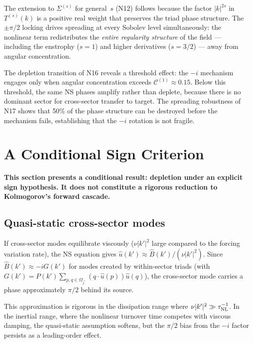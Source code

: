 \documentclass[11pt]{article}
\theoremstyle{definition}
\newcommand{\cC}{\mathcal{C}}
\begin{document}
The extension to $\Sigma^{(s)}$ for general~$s$ (N12)
follows because the factor $|k|^{2s}$ in $T^{(s)}(k)$
is a positive real weight that preserves the triad
phase structure.  The $\pm\pi/2$ locking drives
spreading at every Sobolev level simultaneously: the
nonlinear term redistributes the \emph{entire regularity
structure} of the field --- including the enstrophy
($s=1$) and higher derivatives ($s=3/2$) --- away from
angular concentration.

The depletion transition of N16 reveals a threshold
effect: the $-i$ mechanism engages only when angular
concentration exceeds $\cC^{(1)}\approx 0.15$.  Below
this threshold, the same NS phases amplify rather than
deplete, because there is no dominant sector for
cross-sector transfer to target.  The spreading
robustness of N17 shows that 50\% of the phase
structure can be destroyed before the mechanism fails,
establishing that the $-i$ rotation is not fragile.

\section{A Conditional Sign Criterion}
\label{sec:conditional}

\textbf{This section presents a conditional result:
depletion under an explicit sign hypothesis.  It does
not constitute a rigorous reduction to Kolmogorov's
forward cascade.}

\subsection{Quasi-static cross-sector modes}

If cross-sector modes equilibrate viscously
($\nu|k'|^2$ large compared to the forcing variation
rate), the NS equation gives
$\hat u(k')\approx\hat B(k')/(\nu|k'|^2)$.  Since
$\hat B(k')\approx -iG(k')$ for modes created by
within-sector triads (with
$G(k')=P(k')\sum_{p,q\in\Omega_{j^*}}
(q\cdot\hat u(p))\hat u(q)$), the cross-sector mode
carries a phase approximately $\pi/2$ behind its source.

This approximation is rigorous in the dissipation range
where $\nu|k'|^2\gg\tau_{\rm NL}^{-1}$.  In the
inertial range, where the nonlinear turnover time
competes with viscous damping, the quasi-static
assumption softens, but the $\pi/2$ bias from the $-i$
factor persists as a leading-order effect.
\end{document}
